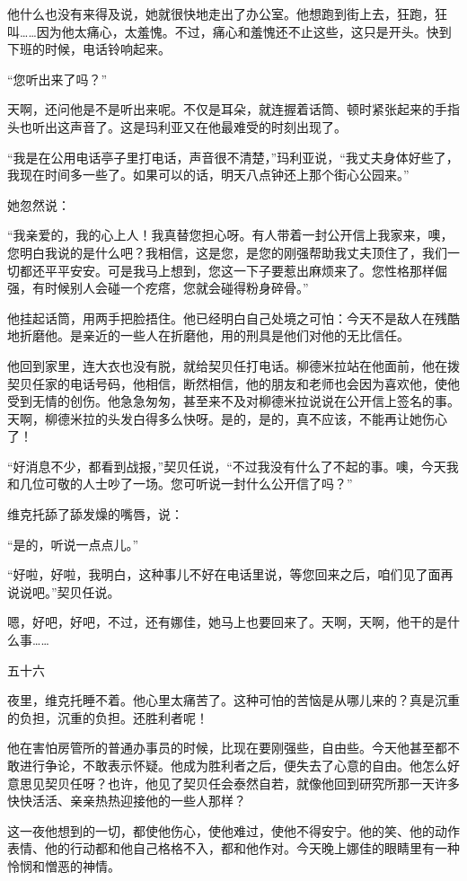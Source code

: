他什么也没有来得及说，她就很快地走出了办公室。他想跑到街上去，狂跑，狂叫……因为他太痛心，太羞愧。不过，痛心和羞愧还不止这些，这只是开头。快到下班的时候，电话铃响起来。

“您听出来了吗？”

天啊，还问他是不是听出来呢。不仅是耳朵，就连握着话筒、顿时紧张起来的手指头也听出这声音了。这是玛利亚又在他最难受的时刻出现了。

“我是在公用电话亭子里打电话，声音很不清楚，”玛利亚说，“我丈夫身体好些了，我现在时间多一些了。如果可以的话，明天八点钟还上那个街心公园来。”

她忽然说：

“我亲爱的，我的心上人！我真替您担心呀。有人带着一封公开信上我家来，噢，您明白我说的是什么吧？我相信，这是您，是您的刚强帮助我丈夫顶住了，我们一切都还平平安安。可是我马上想到，您这一下子要惹出麻烦来了。您性格那样倔强，有时候别人会碰一个疙瘩，您就会碰得粉身碎骨。”

他挂起话筒，用两手把脸捂住。他已经明白自己处境之可怕：今天不是敌人在残酷地折磨他。是亲近的一些人在折磨他，用的刑具是他们对他的无比信任。

他回到家里，连大衣也没有脱，就给契贝任打电话。柳德米拉站在他面前，他在拨契贝任家的电话号码，他相信，断然相信，他的朋友和老师也会因为喜欢他，使他受到无情的创伤。他急急匆匆，甚至来不及对柳德米拉说说在公开信上签名的事。天啊，柳德米拉的头发白得多么快呀。是的，是的，真不应该，不能再让她伤心了！

“好消息不少，都看到战报，”契贝任说，“不过我没有什么了不起的事。噢，今天我和几位可敬的人士吵了一场。您可听说一封什么公开信了吗？”

维克托舔了舔发燥的嘴唇，说：

“是的，听说一点点儿。”

“好啦，好啦，我明白，这种事儿不好在电话里说，等您回来之后，咱们见了面再说说吧。”契贝任说。

嗯，好吧，好吧，不过，还有娜佳，她马上也要回来了。天啊，天啊，他干的是什么事……

五十六

夜里，维克托睡不着。他心里太痛苦了。这种可怕的苦恼是从哪儿来的？真是沉重的负担，沉重的负担。还胜利者呢！

他在害怕房管所的普通办事员的时候，比现在要刚强些，自由些。今天他甚至都不敢进行争论，不敢表示怀疑。他成为胜利者之后，便失去了心意的自由。他怎么好意思见契贝任呀？也许，他见了契贝任会泰然自若，就像他回到研究所那一天许多快快活活、亲亲热热迎接他的一些人那样？

这一夜他想到的一切，都使他伤心，使他难过，使他不得安宁。他的笑、他的动作表情、他的行动都和他自己格格不入，都和他作对。今天晚上娜佳的眼睛里有一种怜悯和憎恶的神情。

